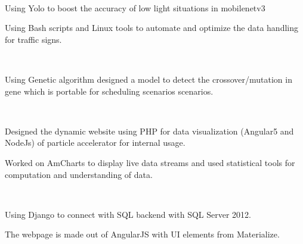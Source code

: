 \documentclass[a4paper]{MagicalCV}
\begin{document}
\begin{minipage}[t]{0.66\textwidth} 


 \\
\vspace{\topsep} %
\begin{tightemize}
\item Using Yolo to boost the accuracy of low light situations in mobilenetv3 
\item Using Bash scripts and Linux tools to automate and optimize the data handling for traffic signs.
\end{tightemize}
\sectionsep

 \\
\vspace{\topsep} %
\begin{tightemize}
\item Using Genetic algorithm designed a model to detect the crossover/mutation in gene which is portable for scheduling scenarios scenarios.
\end{tightemize}
\sectionsep

 \\
\vspace{\topsep} %
\begin{tightemize}
\item Designed the dynamic website using PHP for data visualization (Angular5 and NodeJs) of particle accelerator for internal usage.
\item Worked on AmCharts to display live data streams and used statistical tools for computation and understanding of data.
\end{tightemize}
\sectionsep

 \\
\vspace{\topsep} %
\begin{tightemize}
\item Using Django to connect with SQL backend with SQL Server 2012.
\item The webpage is made out of AngularJS with UI elements from Materialize.
\end{tightemize}
\sectionsep


\end{minipage}
\end{document}
